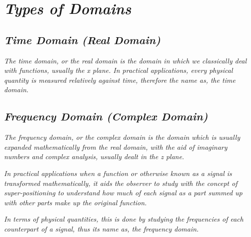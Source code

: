 

\section{\textit{Types of Domains}}
	
	\subsection{\textit{Time Domain (Real Domain)}}
	
		\textit{The time domain, or the real domain is the domain in which we classically deal with functions, usually the x plane. In practical applications, every physical quantity is measured relatively against time, therefore the name as, the time domain.}	
	
	\subsection{\textit{Frequency Domain (Complex Domain)}}

		\textit{The frequency domain, or the complex domain is the domain which is usually expanded mathematically from the real domain, with the aid of imaginary numbers and complex analysis, usually dealt in the z plane.}	

		\textit{In practical applications when a function or otherwise known as a signal is transformed mathematically, it aids the observer to study with the concept of super-positioning to understand how much of each signal as a part summed up with other parts make up the original function.}

		\textit{In terms of physical quantities, this is done by studying the frequencies of each counterpart of a signal, thus its name as, the frequency domain.}


